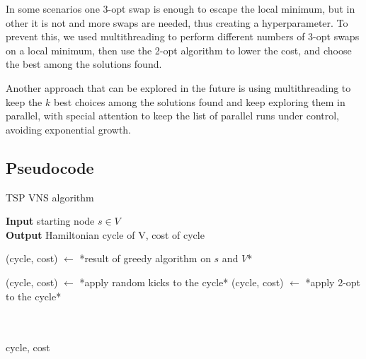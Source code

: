 \begin{figure}[h]
\begin{subfigure}[c]{.4\textwidth}
{
        }
    \end{subfigure}

\end{figure}

In some scenarios one 3-opt swap is enough to escape the local minimum, but in other it is not and more swaps are needed, thus creating a hyperparameter. To prevent this, we used multithreading to perform different numbers of 3-opt swaps on a local minimum, then use the 2-opt algorithm to lower the cost, and choose the best among the solutions found.

Another approach that can be explored in the future is using multithreading to keep the $k$ best choices among the solutions found and keep exploring them in parallel, with special attention to keep the list of parallel runs under control, avoiding exponential growth.

\subsection{Pseudocode}

\begin{algorithm}
    \caption{TSP VNS algorithm}
    
    \textbf{Input} starting node $s\in V$\\
    \textbf{Output} Hamiltonian cycle of V, cost of cycle\\
    \begin{algorithmic}
        
        \State (cycle, cost) $\gets$ *result of greedy algorithm on $s$ and $V$*\\


            \State (cycle, cost) $\gets$ *apply random kicks to the cycle*
            \State (cycle, cost) $\gets$ *apply 2-opt to the cycle*

        \EndWhile\\\\

        \Return cycle, cost
    \end{algorithmic}
\end{algorithm}


